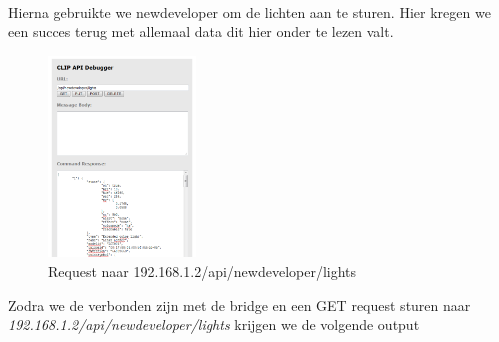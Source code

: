 \documentclass[12pt]{article}
\begin{document}
\\
Hierna gebruikte we newdeveloper om de lichten aan te sturen. Hier kregen we een succes terug met allemaal data dit hier onder te lezen valt.
\begin{figure}[h!]
  \centering
      \includegraphics[width=0.35\textwidth]{stap4}
  \caption{Request naar 192.168.1.2/api/newdeveloper/lights}
\end{figure}
\newpage
Zodra we de verbonden zijn met de bridge en een GET request sturen naar \\\textit{192.168.1.2/api/newdeveloper/lights} krijgen we de volgende output
\end{document}

